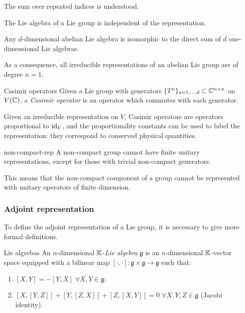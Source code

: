 The sum over repeated indices is understood.

\begin{proposition}{}{}
  The Lie algebra of a Lie group is independent of the representation.
\end{proposition}

\begin{proposition}{}{}
  Any $ d $-dimensional abelian Lie algebra is isomorphic to the direct sum of $ d $ one-dimensional Lie algebras.
\end{proposition}

As a consequence, all irreducible representations of an abelian Lie group are of degree $ n = 1 $.

\begin{definition}{Casimir operators}{}
  Given a Lie group with generators $ \{T^a\}_{a = 1, \dots, d} \subset \mathbb{C}^{n \times n} $ on $ V(\mathbb{C}) $, a \textit{Casimir operator} is an operator which commutes with each generator.
\end{definition}

Given an irreducible representation on $ V $, Casimir operators are operators proportional to $ \operatorname{id}_V $, and the proportionality constants can be used to label the representation: they correspond to conserved physical quantities.

\begin{proposition}{}{non-compact-rep}
  A non-compact group cannot have finite unitary representations, except for those with trivial non-compact generators.
\end{proposition}

This means that the non-compact component of a group cannot be represented with unitary operators of finite dimension.

\subsubsection{Adjoint representation}

To define the adjoint representation of a Lie group, it is necessary to give more formal definitions.

\begin{definition}{Lie algrebas}{}
  An $ n $-dimensional $ \mathbb{K} $-\textit{Lie algebra} $ \mathfrak{g} $ is an $ n $-dimensional $ \mathbb{K} $-vector space equipped with a bilinear map $ [\cdot,\cdot] : \mathfrak{g} \times \mathfrak{g} \rightarrow \mathfrak{g} $ such that:
  \begin{enumerate}
    \item $ [X,Y] = - [Y,X] \,\,\forall X,Y \in \mathfrak{g} $;
    \item $ [X,[Y,Z]] + [Y,[Z,X]] + [Z,[X,Y]] = 0 \,\,\forall X,Y,Z \in \mathfrak{g} $ (Jacobi identity).
  \end{enumerate}
\end{definition}

